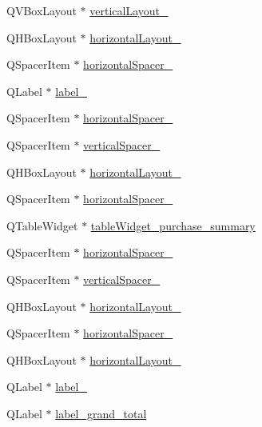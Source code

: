 \begin{DoxyCompactItemize}
\item 
Q\+V\+Box\+Layout $\ast$ \hyperlink{class_ui___main_window_ab35de77115e747d4efa5ecde01d9c16a}{vertical\+Layout\+\_}
\item 
Q\+H\+Box\+Layout $\ast$ \hyperlink{class_ui___main_window_a2afb915e1492b7e6704db4918c1e5e80}{horizontal\+Layout\+\_}
\item 
Q\+Spacer\+Item $\ast$ \hyperlink{class_ui___main_window_a161530c7a59fdb65820f045953376b9b}{horizontal\+Spacer\+\_}
\item 
Q\+Label $\ast$ \hyperlink{class_ui___main_window_a9dc4dba26b83e0c94aa566e1c564420b}{label\+\_}
\item 
Q\+Spacer\+Item $\ast$ \hyperlink{class_ui___main_window_af2b7290d54affa41367b1006fba794f6}{horizontal\+Spacer\+\_}
\item 
Q\+Spacer\+Item $\ast$ \hyperlink{class_ui___main_window_a2e4c63737c14e5af736837df590fe004}{vertical\+Spacer\+\_}
\item 
Q\+H\+Box\+Layout $\ast$ \hyperlink{class_ui___main_window_a3b24c4bb360d79ae2e886fe63c8fdac7}{horizontal\+Layout\+\_}
\item 
Q\+Spacer\+Item $\ast$ \hyperlink{class_ui___main_window_abbed496dbaf0c1a9e78d2a954cd2da88}{horizontal\+Spacer\+\_}
\item 
Q\+Table\+Widget $\ast$ \hyperlink{class_ui___main_window_ae920dd85cdb261df30aa1176d28d6da7}{table\+Widget\+\_\+purchase\+\_\+summary}
\item 
Q\+Spacer\+Item $\ast$ \hyperlink{class_ui___main_window_a60fa81e0d62b9ecf1be9682ca551cef4}{horizontal\+Spacer\+\_}
\item 
Q\+Spacer\+Item $\ast$ \hyperlink{class_ui___main_window_ae6aa3f2ea7a5ff106015aa6ef9f24529}{vertical\+Spacer\+\_}
\item 
Q\+H\+Box\+Layout $\ast$ \hyperlink{class_ui___main_window_a9ab91d59aada4ff82309b36c9d5a0fa6}{horizontal\+Layout\+\_}
\item 
Q\+Spacer\+Item $\ast$ \hyperlink{class_ui___main_window_ab84715d8a46fd81ff73f6e13de103cae}{horizontal\+Spacer\+\_}
\item 
Q\+H\+Box\+Layout $\ast$ \hyperlink{class_ui___main_window_aa53955f35b7d9f3d161525ed8639db84}{horizontal\+Layout\+\_}
\item 
Q\+Label $\ast$ \hyperlink{class_ui___main_window_a882200d8ae16962f5dd3b749ebacbf7e}{label\+\_}
\item 
Q\+Label $\ast$ \hyperlink{class_ui___main_window_a0d2e4bb1e3df883d1c4b8ccd7e8dcabc}{label\+\_\+grand\+\_\+total}

\end{DoxyCompactItemize}
